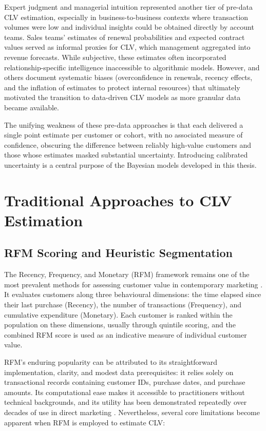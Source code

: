 \documentclass[12pt, a4paper, oneside]{report}
\begin{document}
Expert judgment and managerial intuition represented another tier of pre-data CLV estimation, especially in business-to-business contexts where transaction volumes were low and individual insights could be obtained directly by account teams. Sales teams' estimates of renewal probabilities and expected contract values served as informal proxies for CLV, which management aggregated into revenue forecasts. While subjective, these estimates often incorporated relationship-specific intelligence inaccessible to algorithmic models. However, \textcite{lovallo2003} and others document systematic biases (overconfidence in renewals, recency effects, and the inflation of estimates to protect internal resources) that ultimately motivated the transition to data-driven CLV models as more granular data became available.

The unifying weakness of these pre-data approaches is that each delivered a single point estimate per customer or cohort, with no associated measure of confidence, obscuring the difference between reliably high-value customers and those whose estimates masked substantial uncertainty. Introducing calibrated uncertainty is a central purpose of the Bayesian models developed in this thesis.

\section{Traditional Approaches to CLV Estimation}
\label{sec:traditional}

\subsection{RFM Scoring and Heuristic Segmentation}
\label{sec:rfm}

The Recency, Frequency, and Monetary (RFM) framework remains one of the most prevalent methods for assessing customer value in contemporary marketing \parencite{hughes2011}. It evaluates customers along three behavioural dimensions: the time elapsed since their last purchase (Recency), the number of transactions (Frequency), and cumulative expenditure (Monetary). Each customer is ranked within the population on these dimensions, usually through quintile scoring, and the combined RFM score is used as an indicative measure of individual customer value.

RFM's enduring popularity can be attributed to its straightforward implementation, clarity, and modest data prerequisites: it relies solely on transactional records containing customer IDs, purchase dates, and purchase amounts. Its computational ease makes it accessible to practitioners without technical backgrounds, and its utility has been demonstrated repeatedly over decades of use in direct marketing \parencite{blattberg2008}. Nevertheless, several core limitations become apparent when RFM is employed to estimate CLV:
\end{document}
